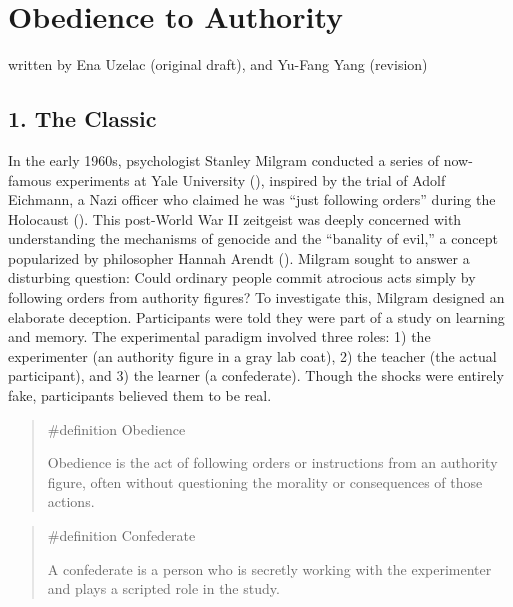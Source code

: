 \documentclass[
  letterpaper,
]{book}
\begin{document}

\chapter{\texorpdfstring{{Obedience to
Authority}}{Obedience to Authority}}\label{obedience-to-authority}

{written by Ena Uzelac (original draft), and Yu-Fang Yang (revision)}

\section{1. The Classic}\label{the-classic-7}

In the early 1960s, psychologist Stanley Milgram conducted a series of
now-famous experiments at Yale University
(), inspired by the
trial of Adolf Eichmann, a Nazi officer who claimed he was ``just
following orders'' during the Holocaust
(). This post-World War II
zeitgeist was deeply concerned with understanding the mechanisms of
genocide and the ``banality of evil,'' a concept popularized by
philosopher Hannah Arendt (). Milgram sought to answer a disturbing question: Could ordinary
people commit atrocious acts simply by following orders from authority
figures? To investigate this, Milgram designed an elaborate deception.
Participants were told they were part of a study on learning and memory.
The experimental paradigm involved three roles: 1) the experimenter (an
authority figure in a gray lab coat), 2) the teacher (the actual
participant), and 3) the learner (a confederate). Though the shocks were
entirely fake, participants believed them to be real.

\begin{quote}
\label{def-obedience}{\#definition} Obedience

Obedience is the act of following orders or instructions from an
authority figure, often without questioning the morality or consequences
of those actions.
\end{quote}

\begin{quote}
\label{def-confederate}{\#definition} Confederate

A confederate is a person who is secretly working with the experimenter
and plays a scripted role in the study.
\end{quote}
\end{document}
